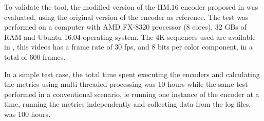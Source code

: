 \documentclass[journal]{IEEEtran}
\begin{document}
To validate the tool, the modified version of the HM.16 encoder proposed in \cite{oliveira:16} was evaluated, using the original version of the encoder as reference. The test was performed on a computer with AMD FX-8320 processor (8 cores), 32 GBs of RAM and Ubuntu 16.04 operating system. The 4K sequences used are available in \cite{sjtu:17}, this videos has a frame rate of 30 fps, and 8 bits per color component, in a total of 600 frames.

In a simple test case, the total time spent executing the encoders and calculating the metrics using multi-threaded processing was 10 hours while the same test performed in a conventional scenario, ie running one instance of the encoder at a time, running the metrics independently and collecting data from the log files, was 100 hours.











\end{document}
